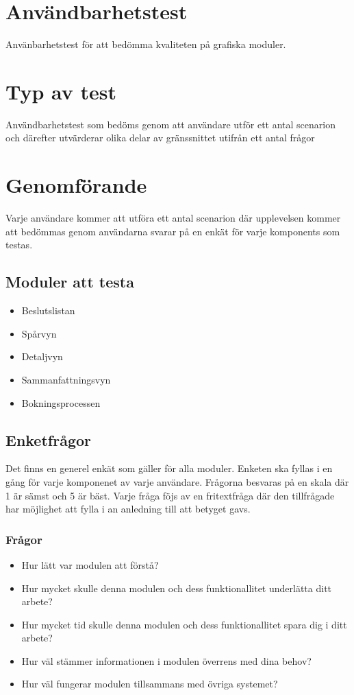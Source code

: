 \documentclass[a4paper,10pt, twoside]{article}
\begin{document}
\section{Användbarhetstest}
Använbarhetstest för att bedömma kvaliteten på grafiska moduler.
\section{Typ av test}
Användbarhetstest som bedöms genom att användare utför ett antal scenarion och därefter utvärderar olika delar av gränssnittet utifrån ett antal frågor
\section{Genomförande}
Varje användare kommer att utföra ett antal scenarion där upplevelsen kommer att bedömmas genom användarna svarar på en enkät för varje komponents som testas.
\subsection{Moduler att testa}
\begin{itemize}
	\item Beslutslistan
	\item Spårvyn
	\item Detaljvyn
	\item Sammanfattningsvyn
	\item Bokningsprocessen
\end{itemize}
\subsection{Enketfrågor}
Det finns en generel enkät som gäller för alla moduler. Enketen ska fyllas i en gång för varje komponenet av varje användare.
Frågorna besvaras på en skala där 1 är sämst och 5 är bäst. Varje fråga föjs av en fritextfråga där den tillfrågade har möjlighet att fylla i an anledning till att betyget gavs.

\subsubsection{Frågor}
\begin{itemize}
	\item Hur lätt var modulen att förstå?
	\item Hur mycket skulle denna modulen och dess funktionallitet underlätta ditt arbete?
	\item Hur mycket tid skulle denna modulen och dess funktionallitet spara dig i ditt arbete?	
	\item Hur väl stämmer informationen i modulen överrens med dina behov?
	\item Hur väl fungerar modulen tillsammans med övriga systemet?
\end{itemize}
\end{document}

